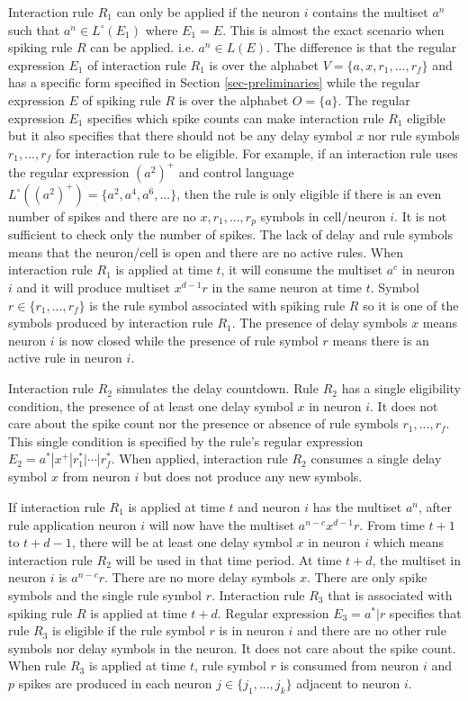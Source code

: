 \documentclass[a4paper]{article}
\theoremstyle{definition}
\begin{document}
Interaction rule $R_1$ can only be applied if the neuron $i$ contains the multiset $a^n$ such that 
$a^n \in L^{\circ}(E_1)$ where $E_1=E$. This is almost the exact scenario when spiking rule $R$ can
be applied. i.e. $a^n \in L(E)$. The difference is that the regular expression $E_1$ of interaction
rule $R_1$ is over the alphabet $V=\{a,x,r_1,...,r_f\}$ and has a specific form specified in Section 
\ref{sec-preliminaries} while the regular expression $E$ of spiking rule $R$ is over the alphabet 
$O=\{a\}$. The regular expression $E_1$ specifies which spike counts can make interaction rule $R_1$ 
eligible but it also specifies that there should not be any delay symbol $x$ nor rule symbols 
$r_1,...,r_f$  for interaction rule to be eligible. For example, if an interaction rule uses the
regular expression $(a^2)^+$ and control language $L^{\circ}((a^2)^+) = \{a^2,a^4,a^6,...\}$, then
the rule is only eligible if there is an even number of spikes and there are no $x,r_1,...,r_p$ 
symbols in cell/neuron $i$. It is not sufficient to check only the number of spikes. The lack of 
delay and rule symbols means that the neuron/cell is open and there are no active rules. When 
interaction rule $R_1$ is applied at time $t$, it will consume the multiset $a^c$ in neuron $i$ and 
it will produce multiset $x^{d-1}r$ in the same neuron at time $t$. Symbol $r \in \{r_1,...,r_f\}$ 
is the rule symbol associated with spiking rule $R$ so it is one of the symbols produced by 
interaction rule $R_1$. The presence of delay symbols $x$ means neuron $i$ is now closed while the
presence of rule symbol $r$ means there is an active rule in neuron $i$.

Interaction rule $R_2$ simulates the delay countdown. Rule $R_2$ has a single eligibility condition,
the presence of at least one delay symbol $x$ in neuron $i$. It does not care about the spike count
nor the presence or absence of rule symbols $r_1,...,r_f$. This single condition is specified by the 
rule's regular expression $E_2 = a^*|x^+|r_1^*|\cdots|r_f^*$. When applied, interaction rule $R_2$ 
consumes a single delay symbol $x$ from neuron $i$ but does not produce any new symbols.

If interaction rule $R_1$ is applied at time $t$ and neuron $i$ has the multiset $a^n$, after rule
application neuron $i$ will now have the multiset $a^{n-c}x^{d-1}r$. From time $t+1$ to $t+d-1$, 
there will be at least one delay symbol $x$ in neuron $i$ which means interaction rule $R_2$ will be 
used in that time period. At time $t+d$, the multiset in neuron $i$ is $a^{n-c}r$. There are no more 
delay symbols $x$. There are only spike symbols and the single rule symbol $r$. Interaction rule 
$R_3$ that is associated with spiking rule $R$ is applied at time $t+d$. Regular expression
$E_3=a^*|r$ specifies that rule $R_3$ is eligible if the rule symbol $r$ is in neuron $i$ and there
are no other rule symbols nor delay symbols in the neuron. It does not care about the spike count.
When rule $R_3$ is applied at time $t$, rule symbol $r$ is consumed from neuron $i$ and $p$ spikes
are produced in each neuron $j \in \{j_1,...,j_k\}$ adjacent to neuron $i$.
\end{document}
